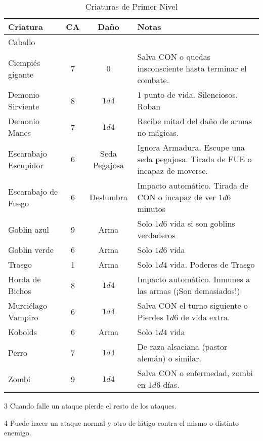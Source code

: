 \begin{table*}[p]
\caption{Criaturas de Primer Nivel}
\label{c:animales}
\centering
\begin{threeparttable}
\begin{tabular}{lccp{8cm}}
\toprule
Criatura             & CA & Daño & Notas\\
\midrule
Caballo              \\
Ciempiés gigante     & 7 & 0 & Salva CON o quedas insconsciente hasta terminar el combate. \\
Demonio Sirviente    & 8 & $1d4$ & 1 punto de vida. Silenciosos. Roban \\
Demonio Manes        & 7 & $ 1d4$ & Recibe mitad del daño de armas no mágicas. \\
Escarabajo Escupidor & 6 & Seda Pegajosa & Ignora Armadura. Escupe una seda pegajosa. Tirada de FUE o incapaz de moverse. \\
Escarabajo de Fuego  & 6 & Deslumbra &  Impacto automático. Tirada de CON o incapaz de ver $ 1d6$ minutos\\
Goblin azul          & 9 & Arma & Solo $1d6$ vida si son goblins verdaderos\\
Goblin verde         & 6 & Arma & Solo $1d6$ vida\\
Trasgo             & 1 & Arma & Solo $1d4$ vida. Poderes de Trasgo\\
Horda de Bichos      & 8 & $1d4$ & Impacto automático. Inmunes a las armas (¡Son demasiados!)\\
Murciélago Vampiro   & 6 & $1d4$ & Salva CON el turno siguiente o Pierdes $1d6$ de vida extra.\\
Kobolds              & 6 & Arma & Solo $1d4$ vida\\
Perro                & 7 & $1d4$ & De raza alsaciana (pastor alemán) o similar.\\
Zombi                & 9 & $ 1d4$ & Salva CON o enfermedad, zombi en $ 1d6$ días.\\
\bottomrule
\bottomrule
\end{tabular}
\begin{tablenotes}
\item 3 Cuando falle un ataque pierde el resto de los ataques.
\item 4 Puede hacer un ataque normal y otro de látigo contra el mismo o distinto enemigo.
\end{tablenotes}
\end{threeparttable}
\end{table*}

